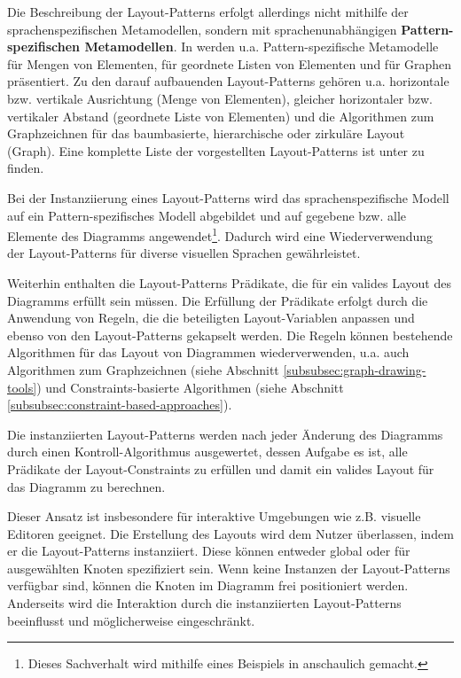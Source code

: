 Die Beschreibung der Layout-Patterns erfolgt allerdings nicht mithilfe der sprachenspezifischen Metamodellen, sondern mit sprachenunabhängigen \textbf{Pattern-spezifischen Metamodellen}. In \cite{Maier12A-Pattern-based} werden u.a. Pattern-spezifische Metamodelle für Mengen von Elementen, für geordnete Listen von Elementen und für Graphen präsentiert. Zu den darauf aufbauenden Layout-Patterns gehören u.a. horizontale bzw. vertikale Ausrichtung (Menge von Elementen), gleicher horizontaler bzw. vertikaler Abstand (geordnete Liste von Elementen) und die Algorithmen zum Graphzeichnen für das baumbasierte, hierarchische oder zirkuläre Layout (Graph). Eine komplette Liste der vorgestellten Layout-Patterns ist unter \cite[S.55]{Maier12A-Pattern-based} zu finden.

Bei der Instanziierung eines Layout-Patterns wird das sprachenspezifische Modell auf ein Pat\-tern-spezifisches Modell abgebildet und auf gegebene bzw. alle Elemente des Diagramms angewendet\footnote{Dieses Sachverhalt wird mithilfe eines Beispiels in \cite[S.59ff]{Maier12A-Pattern-based} anschaulich gemacht.}. Dadurch wird eine Wiederverwendung der Layout-Patterns für diverse visuellen Sprachen gewährleistet.

Weiterhin enthalten die Layout-Patterns Prädikate, die für ein valides Layout des Diagramms erfüllt sein müssen. Die Erfüllung der Prädikate erfolgt durch die Anwendung von Regeln, die die beteiligten Layout-Variablen anpassen und ebenso von den Layout-Patterns gekapselt werden. Die Regeln können bestehende Algorithmen für das Layout von Diagrammen wiederverwenden, u.a. auch Algorithmen zum Graphzeichnen (siehe Abschnitt \ref{subsubsec:graph-drawing-tools}) und Constraints-basierte Algorithmen (siehe Abschnitt \ref{subsubsec:constraint-based-approaches}).

Die instanziierten Layout-Patterns werden nach jeder Änderung des Diagramms durch einen Kontroll-Algorithmus ausgewertet, dessen Aufgabe es ist, alle Prädikate der Layout-Constraints zu erfüllen und damit ein valides Layout für das Diagramm zu berechnen.

Dieser Ansatz ist insbesondere für interaktive Umgebungen wie z.B. visuelle Editoren geeignet. Die Erstellung des Layouts wird dem Nutzer überlassen, indem er die Layout-Patterns instanziiert. Diese können entweder global oder für ausgewählten Knoten spezifiziert sein. Wenn keine Instanzen der Layout-Patterns verfügbar sind, können die Knoten im Diagramm frei positioniert werden. Anderseits wird die Interaktion durch die instanziierten Layout-Patterns beeinflusst und möglicherweise eingeschränkt.

